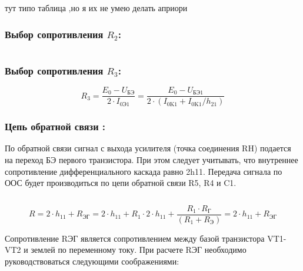 тут типо таблица ,но я их не умею делать априори

\subsubsection{Выбор сопротивления $R_{\text{2}}$:}
\begin{equation}
\label{eq:equation4_3}

\end{equation}

\subsubsection{Выбор сопротивления $R_{\text{3}}$:}

\begin{equation}
\label{eq:equation4_4}
R_3=\dfrac{E_{\text{0}}- U_{\text{БЭ}}} {2 \cdot I_{\text{0Э1}}} = \dfrac{E_{\text{0}}-U_{\text {БЭ1}}}{ 2 \cdot ( I_\text{0K1}+I_\text{0K1} / h_\text{21} )}
\end{equation}
\begin{equation*}

\end{equation*}


\subsubsection {Цепь обратной связи :}

По обратной связи сигнал с выхода усилителя (точка соединения RH) подается на переход БЭ первого транзистора. При этом следует учитывать, что внутреннее сопротивление дифференциального каскада равно 2h11. Передача сигнала по ООС будет производиться по цепи обратной связи R5, R4 и C1.


\begin{equation}
\label{eq:equation4_5}

\end{equation}

\begin{equation}
\label{eq:equation4_6}
R=2 \cdot h_{11}+R_{\text{ЭГ}}=2 \cdot h_{11}+R_1 \cdot 2 \cdot h_{11}+\dfrac{R_1 \cdot R_{\text{Г}}}{(R_1+R_{\text{Э}})}=2 \cdot h_{11}+R_{\text{ЭГ}}
\end{equation}
\begin{equation*}

\end{equation*}

Сопротивление RЭГ является сопротивлением между базой транзистора VT1-VT2 и землей по переменному току. При расчете RЭГ необходимо руководствоваться следующими соображениями:
\begin{equation}
\label{eq:equation4_7}

\end{equation}

